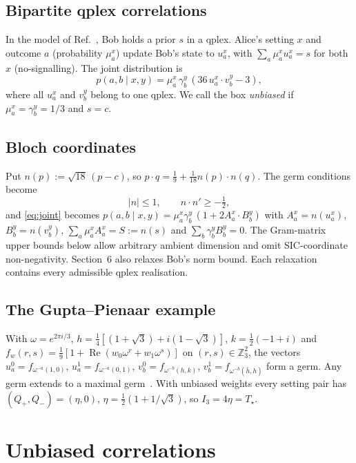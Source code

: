 \documentclass[11pt]{article}
\theoremstyle{definition}
\newcommand{\Tq}{T_{\star}}
\newcommand{\re}{\operatorname{Re}}
\begin{document}
\subsection{Bipartite qplex correlations}
In the model of Ref.~\cite{GuptaPienaar2026}, Bob holds a prior $s$ in a qplex. Alice's setting $x$ and outcome $a$ (probability $\mu^x_a$) update Bob's state
to $u^x_a$, with $\sum_a\mu^x_a u^x_a=s$ for both $x$ (no-signalling). The joint distribution is
\begin{equation}\label{eq:joint}
p(a,b\mid x,y) = \mu^x_a\,\gamma^y_b\,(36\,u^x_a\cdot v^y_b-3),
\end{equation}
where all $u^x_a$ and $v^y_b$ belong to one qplex. We call the box \emph{unbiased} if $\mu^x_a=\gamma^y_b=1/3$ and
$s=c$.

\subsection{Bloch coordinates}
Put $n(p):=\sqrt{18}\,(p-c)$, so $p\cdot q=\tfrac19+\tfrac1{18}n(p)\cdot n(q)$. The germ conditions become
\begin{equation}\label{eq:bloch}
|n|\le1,\qquad n\cdot n'\ge-\tfrac12 ,
\end{equation}
and \eqref{eq:joint} becomes $p(a,b\mid x,y)=\mu^x_a\gamma^y_b\,(1+2A^x_a\cdot B^y_b)$ with
$A^x_a=n(u^x_a)$, $B^y_b=n(v^y_b)$, $\sum_a\mu^x_aA^x_a=S:=n(s)$ and $\sum_b\gamma^y_bB^y_b=0$.
The Gram-matrix upper bounds below allow arbitrary ambient dimension and omit SIC-coordinate
non-negativity. Section~6 also relaxes Bob's norm bound. Each relaxation contains every admissible qplex realisation.

\subsection{The Gupta--Pienaar example}
With $\omega=e^{2\pi i/3}$, $h=\tfrac14[(1+\sqrt3)+i(1-\sqrt3)]$, $k=\tfrac12(-1+i)$ and
$f_w(r,s)=\tfrac19[1+\re(w_0\omega^r+w_1\omega^s)]$ on $(r,s)\in\mathbb{Z}_3^2$, the vectors
$u^0_a=f_{\omega^{-a}(1,0)}$, $u^1_a=f_{\omega^{-a}(0,1)}$, $v^0_b=f_{\omega^{-b}(h,k)}$, $v^1_b=f_{\omega^{-b}(\bar h,h)}$
form a germ. Any germ extends to a maximal germ~\cite{Qplex2017}. With unbiased weights every setting pair has $(Q_+,Q_-)=(\eta,0)$, $\eta=\tfrac12(1+1/\sqrt3)$, so
$I_3=4\eta=\Tq$.

\section{Unbiased correlations}
\end{document}
